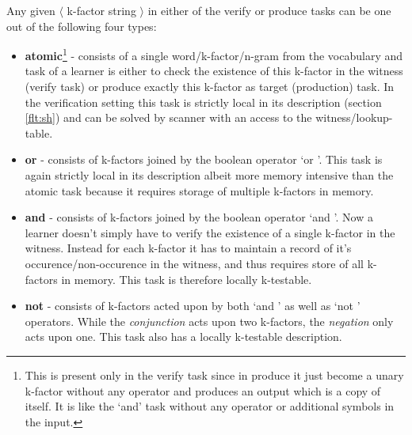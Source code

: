 Any given $\langle$ k-factor string $\rangle$ in either of the verify or produce tasks can be one out of the following four types:
\begin{itemize}
	\item \textbf{atomic}\footnote{This is present only in the verify task since in produce it just become a unary k-factor without any operator and produces an output which is a copy of itself. It is like the \lq and\rq{} task without any operator or additional symbols in the input.} - consists of a single word/k-factor/n-gram from the vocabulary and task of a learner is either to check the existence of this k-factor in the witness (verify task) or produce exactly this k-factor as target (production) task. In the verification setting this task is strictly local in its description (section \ref{flt:sh}) and can be solved by scanner with an access to the witness/lookup-table.
	\item \textbf{or} - consists of k-factors joined by the boolean operator \lq or \rq{}. This task is again strictly local in its description albeit more memory intensive than the atomic task because it requires storage of multiple k-factors in memory.
	\item \textbf{and} - consists of k-factors joined by the boolean operator \lq and \rq{}. Now a learner doesn't simply have to verify the existence of a single k-factor in the witness. Instead for each k-factor it has to maintain a record of it's occurence/non-occurence in the witness, and thus requires store of all k-factors in memory. This task is therefore locally k-testable. 
	\item \textbf{not} - consists of k-factors acted upon by both \lq and \rq{} as well as \lq not \rq{} operators. While the \textit{conjunction} acts upon two k-factors, the \textit{negation} only acts upon one. This task also has a locally k-testable description. 
\end{itemize}



